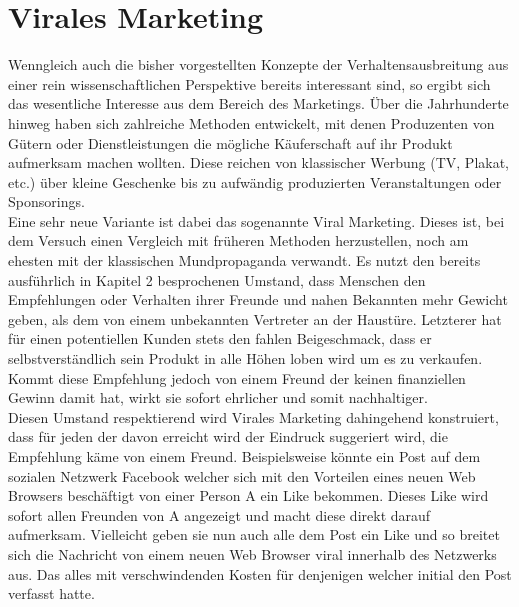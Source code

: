 \documentclass[12pt]{article}
\begin{document}
\section{Virales Marketing}
Wenngleich auch die bisher vorgestellten Konzepte der Verhaltensausbreitung aus einer rein wissenschaftlichen Perspektive bereits interessant sind, so ergibt sich das wesentliche Interesse aus dem Bereich des Marketings. Über die Jahrhunderte hinweg haben sich zahlreiche Methoden entwickelt, mit denen Produzenten von Gütern oder Dienstleistungen die mögliche Käuferschaft auf ihr Produkt aufmerksam machen wollten. Diese reichen von klassischer Werbung (TV, Plakat, etc.) über kleine Geschenke bis zu aufwändig produzierten Veranstaltungen oder Sponsorings.\\ Eine sehr neue Variante ist dabei das sogenannte Viral Marketing. Dieses ist, bei dem Versuch einen Vergleich mit früheren Methoden herzustellen, noch am ehesten mit der klassischen Mundpropaganda verwandt. Es nutzt den bereits ausführlich in Kapitel 2 besprochenen Umstand, dass Menschen den Empfehlungen oder Verhalten ihrer Freunde und nahen Bekannten mehr Gewicht geben, als dem von einem unbekannten Vertreter an der Haustüre. Letzterer hat für einen potentiellen Kunden stets den fahlen Beigeschmack, dass er selbstverständlich sein Produkt in alle Höhen loben wird um es zu verkaufen. Kommt diese Empfehlung jedoch von einem Freund der keinen finanziellen Gewinn damit hat, wirkt sie sofort ehrlicher und somit nachhaltiger.\\
Diesen Umstand respektierend wird Virales Marketing dahingehend konstruiert, dass für jeden der davon erreicht wird der Eindruck suggeriert wird, die Empfehlung käme von einem Freund. Beispielsweise könnte ein Post auf dem sozialen Netzwerk Facebook welcher sich mit den Vorteilen eines neuen Web Browsers beschäftigt von einer Person A ein Like bekommen. Dieses Like wird sofort allen Freunden von A angezeigt und macht diese direkt darauf aufmerksam. Vielleicht geben sie nun auch alle dem Post ein Like und so breitet sich die Nachricht von einem neuen Web Browser viral innerhalb des Netzwerks aus. Das alles mit verschwindenden Kosten für denjenigen welcher initial den Post verfasst hatte.
\end{document}
